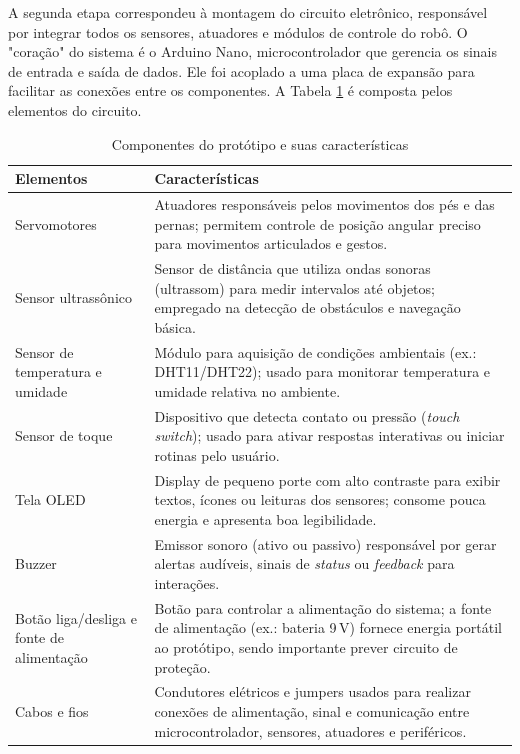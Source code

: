 \documentclass[portuguese]{textolivre}
\begin{document}
A segunda etapa correspondeu à montagem do circuito eletrônico, responsável por integrar todos os sensores, atuadores e módulos de controle do robô. O "coração" do sistema é o Arduino Nano, microcontrolador que gerencia os sinais de entrada e saída de dados. Ele foi acoplado a uma placa de expansão para facilitar as conexões entre os componentes. A Tabela \ref{elementos} é composta pelos elementos do circuito.

\begin{table}[ht!]
		\centering
		\caption{Componentes do protótipo e suas características}
		\label{elementos}
		\begin{tabularx}{\textwidth}{@{}lX@{}}
			\toprule
			Elementos & Características \\
			\midrule
			Servomotores &
			Atuadores responsáveis pelos movimentos dos pés e das pernas; permitem controle de posição angular preciso para movimentos articulados e gestos. \\
			\addlinespace
			Sensor ultrassônico &
			Sensor de distância que utiliza ondas sonoras (ultrassom) para medir intervalos até objetos; empregado na detecção de obstáculos e navegação básica. \\
			\addlinespace
			Sensor de temperatura e umidade &
			Módulo para aquisição de condições ambientais (ex.: DHT11/DHT22); usado para monitorar temperatura e umidade relativa no ambiente. \\
			\addlinespace
			Sensor de toque &
			Dispositivo que detecta contato ou pressão (\textit{touch switch}); usado para ativar respostas interativas ou iniciar rotinas pelo usuário. \\
			\addlinespace
			Tela OLED &
			Display de pequeno porte com alto contraste para exibir textos, ícones ou leituras dos sensores; consome pouca energia e apresenta boa legibilidade. \\
			\addlinespace
			Buzzer &
			Emissor sonoro (ativo ou passivo) responsável por gerar alertas audíveis, sinais de \textit{status} ou \textit{feedback} para interações. \\
			\addlinespace
			Botão liga/desliga e fonte de alimentação &
			Botão para controlar a alimentação do sistema; a fonte de alimentação (ex.: bateria 9\,V) fornece energia portátil ao protótipo, sendo importante prever circuito de proteção. \\
			\addlinespace
			Cabos e fios &
			Condutores elétricos e jumpers usados para realizar conexões de alimentação, sinal e comunicação entre microcontrolador, sensores, atuadores e periféricos. \\

\end{tabularx}
\end{table}
\end{document}

